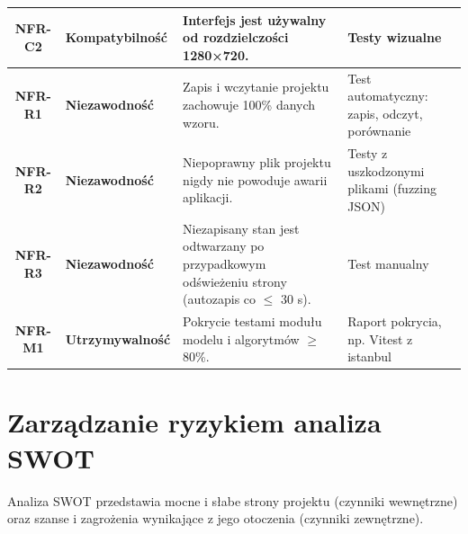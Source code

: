 \documentclass[a4paper,11pt]{article}
\begin{document}
\begin{xltabular}{0.95\textwidth}{|c|l|X|X|}
  \hline
  \textbf{NFR-C2} & \textbf{Kompatybilność} & Interfejs jest używalny od rozdzielczości 1280×720. & Testy wizualne \\
  \hline
  \textbf{NFR-R1} & \textbf{Niezawodność} & Zapis i wczytanie projektu zachowuje 100\% danych wzoru. & Test automatyczny: zapis, odczyt, porównanie \\
  \hline
  \textbf{NFR-R2} & \textbf{Niezawodność} & Niepoprawny plik projektu nigdy nie powoduje awarii aplikacji. & Testy z uszkodzonymi plikami (fuzzing JSON) \\
  \hline
  \textbf{NFR-R3} & \textbf{Niezawodność} & Niezapisany stan jest odtwarzany po przypadkowym odświeżeniu strony (autozapis co $\leq$ 30 s). & Test manualny \\
  \hline
  \textbf{NFR-M1} & \textbf{Utrzymywalność} & Pokrycie testami modułu modelu i algorytmów $\geq$ 80\%. & Raport pokrycia, np. Vitest z istanbul \\
  \hline
\end{xltabular}

\pagebreak

\section{Zarządzanie ryzykiem {\textendash} analiza SWOT}

Analiza SWOT przedstawia mocne i słabe strony projektu (czynniki wewnętrzne) oraz szanse i zagrożenia wynikające z jego otoczenia (czynniki zewnętrzne).
\vspace{0.5cm}
\end{document}
